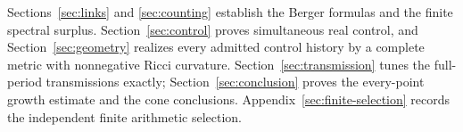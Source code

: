 Sections~\ref{sec:links} and \ref{sec:counting} establish the Berger formulas
and the finite spectral surplus. Section~\ref{sec:control} proves simultaneous
real control, and Section~\ref{sec:geometry} realizes every admitted control
history by a complete metric with nonnegative Ricci curvature.
Section~\ref{sec:transmission} tunes the full-period transmissions exactly;
Section~\ref{sec:conclusion} proves the every-point growth estimate and the
cone conclusions. Appendix~\ref{sec:finite-selection} records the independent
finite arithmetic selection.
